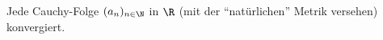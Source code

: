 Jede Cauchy-Folge $(a_n)_{n \in \N}$ in $\R$ (mit der \enquote{natürlichen} Metrik versehen) konvergiert.